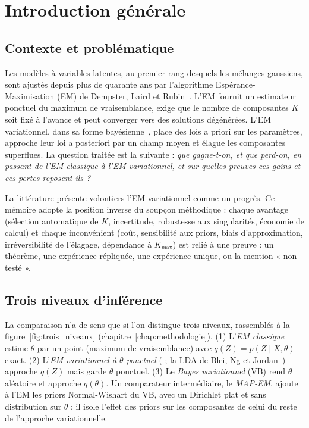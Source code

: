 \chapter*{Introduction générale}

\section*{Contexte et problématique}
Les modèles à variables latentes, au premier rang desquels les mélanges gaussiens, sont ajustés depuis plus de quarante ans par l'algorithme Espérance-Maximisation (EM) de Dempster, Laird et Rubin~\cite{dempster1977}. L'EM fournit un estimateur ponctuel du maximum de vraisemblance, exige que le nombre de composantes $K$ soit fixé à l'avance et peut converger vers des solutions dégénérées. L'EM variationnel, dans sa forme bayésienne~\cite{attias2000,bishop2006}, place des lois a priori sur les paramètres, approche leur loi a posteriori par un champ moyen et élague les composantes superflues. La question traitée est la suivante : \emph{que gagne-t-on, et que perd-on, en passant de l'EM classique à l'EM variationnel, et sur quelles preuves ces gains et ces pertes reposent-ils ?}

La littérature présente volontiers l'EM variationnel comme un progrès. Ce mémoire adopte la position inverse du soupçon méthodique : chaque avantage (sélection automatique de $K$, incertitude, robustesse aux singularités, économie de calcul) et chaque inconvénient (coût, sensibilité aux priors, biais d'approximation, irréversibilité de l'élagage, dépendance à $K_{\max}$) est relié à une preuve : un théorème, une expérience répliquée, une expérience unique, ou la mention « non testé ».

\section*{Trois niveaux d'inférence}
La comparaison n'a de sens que si l'on distingue trois niveaux, rassemblés à la figure~\ref{fig:trois_niveaux} (chapitre~\ref{chap:methodologie}). (1) L'\emph{EM classique} estime $\theta$ par un point (maximum de vraisemblance) avec $q(Z) = p(Z \mid X, \theta)$ exact. (2) L'\emph{EM variationnel à $\theta$ ponctuel} (\cite{neal1998} ; la LDA de Blei, Ng et Jordan~\cite{blei2003}) approche $q(Z)$ mais garde $\theta$ ponctuel. (3) Le \emph{Bayes variationnel} (VB) rend $\theta$ aléatoire et approche $q(\theta)$. Un comparateur intermédiaire, le \emph{MAP-EM}, ajoute à l'EM les priors Normal-Wishart du VB, avec un Dirichlet plat et sans distribution sur $\theta$ : il isole l'effet des priors sur les composantes de celui du reste de l'approche variationnelle.

